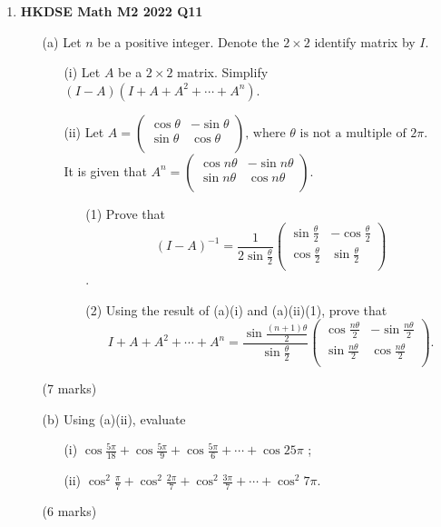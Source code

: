 \documentclass{report}
\begin{document}
\begin{enumerate}
	\newpage

	\item \textbf{HKDSE Math M2 2022 Q11}
	\begin{enumerate}
		\item [(a)] Let $n$ be a positive integer. Denote the $2\times2$ identify matrix by $I$. 
		\begin{enumerate}
			\item [(i)] Let $A$ be a $2\times2$ matrix. Simplify $(I - A)(I + A + A^2 + \cdots + A^n)$.
			\item [(ii)]Let $A = 
				\begin{pmatrix}
				\cos{\theta}&-\sin{\theta}\\
				\sin{\theta}&\cos{\theta}\\
				\end{pmatrix} \text{, 
				where } \theta \text{ is not a multiple of } 2\pi$.\\
				It is given that $A^n = 
				\begin{pmatrix}
				\cos{n\theta}&-\sin{n\theta}\\
				\sin{n\theta}&\cos{n\theta}\\
				\end{pmatrix}$. 
			\begin{enumerate}
				\item [(1)] Prove that $$\displaystyle(I - A) ^{-1} = \frac{1}{2\sin{\displaystyle\frac{\theta}{2}}} 
					\begin{pmatrix}
						\sin{\displaystyle\frac{\theta}{2}}&-\cos{\displaystyle\frac{\theta}{2}}\\
						\cos{\displaystyle\frac{\theta}{2}}&\sin{\displaystyle\frac{\theta}{2}}\\
					\end{pmatrix}$$.
				\item[(2)] Using the result of (a)(i) and (a)(ii)(1), prove that $$I+A+A^2+\cdots+A^n = \displaystyle\frac{\sin{\displaystyle\frac{(n+1)\theta}{2}}}{\sin{\displaystyle\frac{\theta}{2}}}
					\begin{pmatrix}
						\cos{\displaystyle\frac{n\theta}{2}}&-\sin{\displaystyle\frac{n\theta}{2}}\\
						\sin{\displaystyle\frac{n\theta}{2}}&\cos{\displaystyle\frac{n\theta}{2}}\\
					\end{pmatrix}.$$
			\end{enumerate}
		\end{enumerate}
		(7 marks)
		\item[(b)]Using (a)(ii), evaluate
		\begin{enumerate}
			\item [(i)]$\cos{\displaystyle\frac{5\pi}{18}}+\cos{\displaystyle\frac{5\pi}{9}}+\cos{\displaystyle\frac{5\pi}{6}}+\cdots+\cos{25\pi}$ ; 
			\item [(ii)]$\cos^2{\displaystyle\frac{\pi}{7}}+\cos^2{\displaystyle\frac{2\pi}{7}}+\cos^2{\displaystyle\frac{3\pi}{7}}+\cdots+\cos^2{7\pi}$. 
		\end{enumerate}
	(6 marks)
	\end{enumerate}


\end{enumerate}
\end{document}
